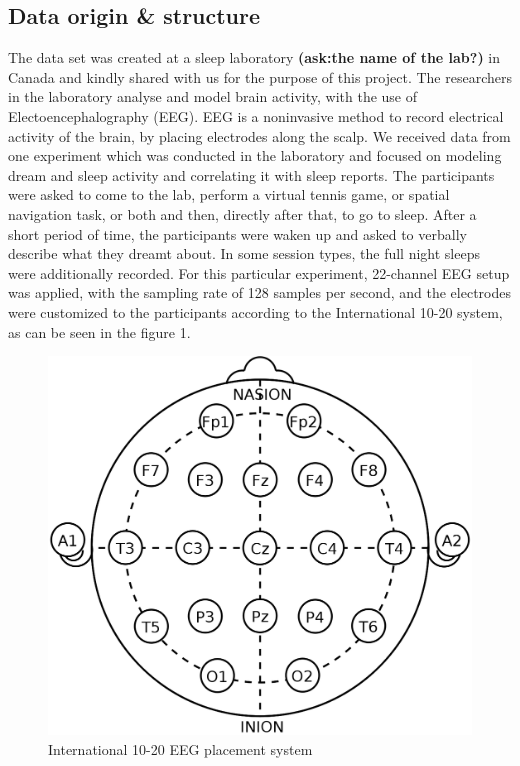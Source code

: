 \documentclass{article}
\begin{document}
\subsection{Data origin \& structure}
\label{ssec:data_structure}
The data set was created at a sleep laboratory \textbf{(ask:the name of the lab?)} in Canada and kindly shared with us for the purpose of this project. The researchers in the laboratory analyse and model brain activity, with the use of Electoencephalography (EEG). EEG is a noninvasive method to record electrical activity of the brain, by placing electrodes along the scalp. We received data from one experiment which was conducted in the laboratory and focused on modeling dream and sleep activity and correlating it with sleep reports. The participants were asked to come to the lab, perform a virtual tennis game, or spatial navigation task, or both and then, directly after that, to go to sleep. After a short period of time, the participants were waken up and asked to verbally describe what they dreamt about. In some session types, the full night sleeps were additionally recorded. For this particular experiment, 22-channel EEG setup was applied, with the sampling rate of 128 samples per second, and the electrodes were customized to the participants according to the International 10-20 system, as can be seen in the figure 1.
\begin{figure}[!ht]
	\centering
	\includegraphics[scale=0.1]{eeg}
	\caption{International 10-20 EEG placement system}
\end{figure} 
\end{document}
